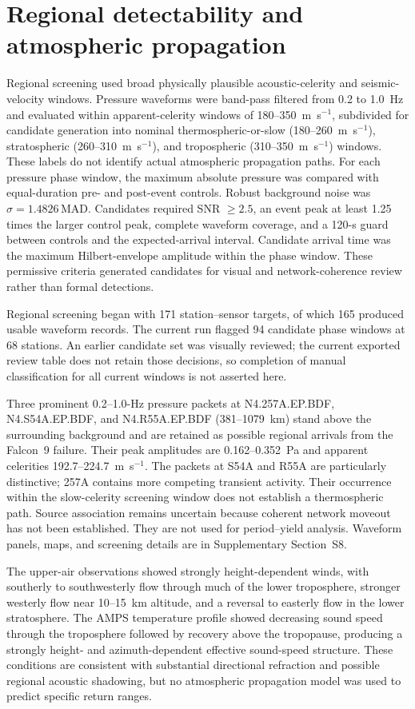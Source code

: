 \documentclass[]{seismica}
\begin{document}
\section{Regional detectability and atmospheric propagation}
\label{sec:regional}

Regional screening used broad physically plausible acoustic-celerity and
seismic-velocity windows. Pressure waveforms were band-pass filtered from 0.2
to 1.0~Hz and evaluated within apparent-celerity windows of
180--350~m~s$^{-1}$, subdivided for candidate generation into nominal
thermospheric-or-slow (180--260~m~s$^{-1}$), stratospheric
(260--310~m~s$^{-1}$), and tropospheric (310--350~m~s$^{-1}$) windows. These
labels do not identify actual atmospheric propagation paths. For each pressure
phase window, the maximum absolute pressure was compared with equal-duration
pre- and post-event controls. Robust background noise was
$\sigma=1.4826\,\mathrm{MAD}$. Candidates required SNR $\geq2.5$, an event
peak at least 1.25 times the larger control peak, complete waveform coverage,
and a 120-s guard between controls and the expected-arrival interval. Candidate
arrival time was the maximum Hilbert-envelope amplitude within the phase
window. These permissive criteria generated candidates for visual and
network-coherence review rather than formal detections.

Regional screening began with 171 station--sensor targets, of which 165
produced usable waveform records. The current run flagged 94 candidate phase
windows at 68 stations. An earlier candidate set was visually reviewed; the
current exported review table does not retain those decisions, so completion
of manual classification for all current windows is not asserted here.

Three prominent 0.2--1.0-Hz pressure packets at N4.257A.EP.BDF,
N4.S54A.EP.BDF, and N4.R55A.EP.BDF (381--1079~km) stand above the surrounding
background and are retained as possible regional arrivals from the Falcon~9
failure. Their peak amplitudes are 0.162--0.352~Pa and apparent celerities
192.7--224.7~m~s$^{-1}$. The packets at S54A and R55A are particularly
distinctive; 257A contains more competing transient activity. Their occurrence
within the slow-celerity screening window does not establish a thermospheric
path. Source association remains uncertain because coherent network moveout
has not been established. They are not used for period--yield analysis.
Waveform panels, maps, and screening details are in Supplementary Section~S8.

The upper-air observations showed strongly height-dependent winds, with
southerly to southwesterly flow through much of the lower troposphere, stronger
westerly flow near 10--15~km altitude, and a reversal to easterly flow in the
lower stratosphere. The AMPS temperature profile showed decreasing sound speed
through the troposphere followed by recovery above the tropopause, producing a
strongly height- and azimuth-dependent effective sound-speed structure. These
conditions are consistent with substantial directional refraction and possible
regional acoustic shadowing, but no atmospheric propagation model was used to
predict specific return ranges.
\end{document}
